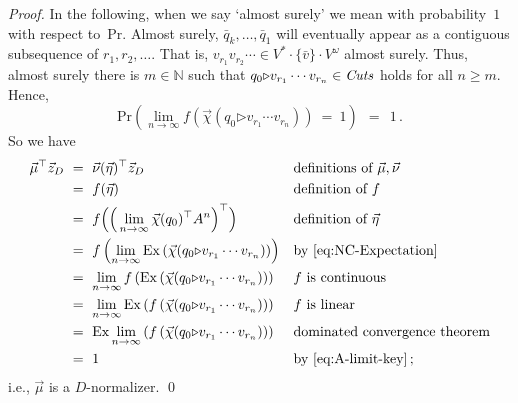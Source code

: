 \documentclass{elsarticle}
\def\Nat{\mathbb{N}}
\def\Pr{\mathrm{Pr}}
\newcommand{\Ex}{\mathrm{Ex}}
\newcommand{\then}{\mathord{\triangleright}}
\begin{document}
\begin{proof}
In the following, when we say `almost surely' we mean with probability~$1$ with respect to~$\Pr$.
Almost surely, $\bar q_k, \ldots, \bar q_1$ will eventually appear as a contiguous subsequence of $r_1, r_2, \ldots$.
That is, $v_{r_1} v_{r_2} \cdots \in V^* \cdot \{\bar v\} \cdot V^\omega$ almost surely.
Thus, almost surely there is $m \in \Nat$ such that $q_0 \then v_{r_1} \cdots v_{r_n} \in \Cuts$ holds for all $n \geqslant m$.
Hence,
\begin{equation} \label{eq:A-limit-key}
\Pr\left(\lim_{n \to \infty} f\left(\vec{\chi}(q_0 \then v_{r_1} \cdots v_{r_n})\right) \ = \ 1\right) \ \ = \ \ 1\,.
\end{equation}
So we have
\begin{align*}
\vec{\mu}^\top \vec{z}_D \
&=\ \vec{\nu}(\vec{\eta})^\top \vec{z}_D && \text{definitions of $\vec{\mu}, \vec{\nu}$} \\
&=\ f(\vec{\eta}) && \text{definition of $f$} \\
&=\ f\Big(\Big(\lim_{n \to \infty} \vec{\chi}(q_0)^\top A^n\Big)^\top\Big) && \text{definition of~$\vec{\eta}$} \\
&=\ f\left(\lim_{n \to \infty} \Ex\left(\vec{\chi}(q_0 \then v_{r_1} \cdots v_{r_n})\right)\right) && \text{by \eqref{eq:NC-Expectation}} \\
&=\ \lim_{n \to \infty} f\left(\Ex\left(\vec{\chi}(q_0 \then v_{r_1} \cdots v_{r_n})\right)\right) && \text{$f$ is continuous} \\
&=\ \lim_{n \to \infty} \Ex\left(f\left(\vec{\chi}(q_0 \then v_{r_1} \cdots v_{r_n})\right)\right) && \text{$f$ is linear} \\
&=\ \Ex \lim_{n \to \infty} \left(f\left(\vec{\chi}(q_0 \then v_{r_1} \cdots v_{r_n})\right)\right) && \text{dominated convergence theorem} \\
&=\ 1 && \text{by~\eqref{eq:A-limit-key}\,;}
\end{align*}
i.e., $\vec{\mu}$ is a $D$-normalizer.
\qed
\end{proof}
\end{document}

